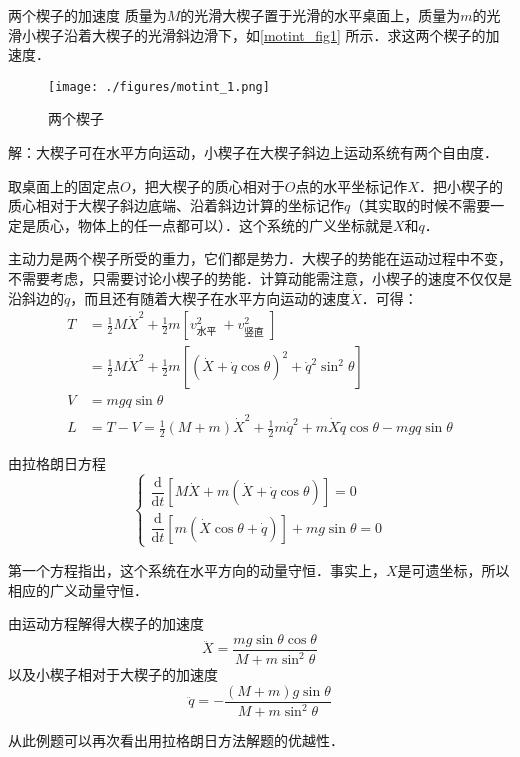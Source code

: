\begin{example}{两个楔子的加速度}
质量为$M $的光滑大楔子置于光滑的水平桌面上，质量为$m$的光滑小楔子沿着大楔子的光滑斜边滑下，如\autoref{motint_fig1} 所示．求这两个楔子的加速度．
\begin{figure}[ht]
\centering
\texttt{[image: ./figures/motint\_1.png]}
\caption{两个楔子} \label{motint_fig1}
\end{figure}

解：大楔子可在水平方向运动，小楔子在大楔子斜边上运动系统有两个自由度．

取桌面上的固定点$O$，把大楔子的质心相对于$O$点的水平坐标记作$X $．把小楔子的质心相对于大楔子斜边底端、沿着斜边计算的坐标记作$q$（其实取的时候不需要一定是质心，物体上的任一点都可以）．这个系统的广义坐标就是$X $和$q $．

主动力是两个楔子所受的重力，它们都是势力．大楔子的势能在运动过程中不变，不需要考虑，只需要讨论小楔子的势能．计算动能需注意，小楔子的速度不仅仅是沿斜边的$\dot q$，而且还有随着大楔子在水平方向运动的速度$\dot X$．可得：
\begin{equation}
\begin{aligned} T &=\frac{1}{2} M \dot{X}^{2}+\frac{1}{2} m\left[v_{\text {水平 }}^{2}+v_{\text {竖直 }}^{2}\right] \\ &=\frac{1}{2} M \dot{X}^{2}+\frac{1}{2} m\left[(\dot{X}+\dot{q} \cos \theta)^{2}+\dot{q}^{2} \sin ^{2} \theta\right] \\ V &=m g q \sin \theta \\ L &=T-V=\frac{1}{2}(M+m) \dot{X}^{2}+\frac{1}{2} m \dot{q}^{2}+m \dot{X} \dot{q} \cos \theta-m g q \sin \theta \end{aligned}
\end{equation}

由拉格朗日方程
\begin{equation}
\begin{cases}
\dfrac{\mathrm{d}}{\mathrm{d} t}[M \dot{X}+m(\dot{X}+\dot{q} \cos \theta)]=0 \\ \dfrac{\mathrm{d}}{\mathrm{d} t}[m(\dot{X} \cos \theta+\dot{q})]+m g \sin \theta=0
\end{cases}
\end{equation}

第一个方程指出，这个系统在水平方向的动量守恒．事实上，$X$是可遗坐标，所以相应的广义动量守恒．

由运动方程解得大楔子的加速度
\begin{equation}
\ddot{X}=\frac{m g \sin \theta \cos \theta}{M+m \sin ^{2} \theta}
\end{equation}
以及小楔子相对于大楔子的加速度
\begin{equation}
\ddot{q}=-\frac{(M+m) g \sin \theta}{M+m \sin ^{2} \theta}
\end{equation}
\end{example}
从此例题可以再次看出用拉格朗日方法解题的优越性．


